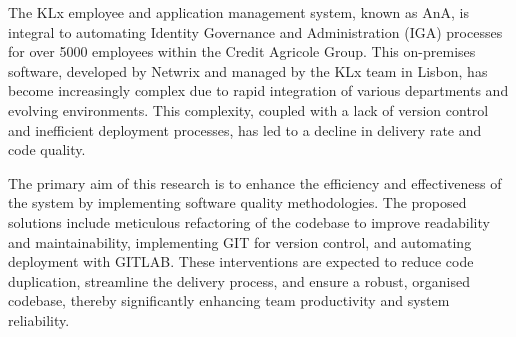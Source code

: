 
%

The KLx employee and application management system, known as AnA, is integral to automating Identity Governance and Administration (IGA) processes for over 5000 employees within the Credit Agricole Group. This on-premises software, developed by Netwrix and managed by the KLx team in Lisbon, has become increasingly complex due to rapid integration of various departments and evolving environments. This complexity, coupled with a lack of version control and inefficient deployment processes, has led to a decline in delivery rate and code quality.

The primary aim of this research is to enhance the efficiency and effectiveness of the system by implementing software quality methodologies. The proposed solutions include meticulous refactoring of the codebase to improve readability and maintainability, implementing GIT for version control, and automating deployment with GITLAB. These interventions are expected to reduce code duplication, streamline the delivery process, and ensure a robust, organised codebase, thereby significantly enhancing team productivity and system reliability.

